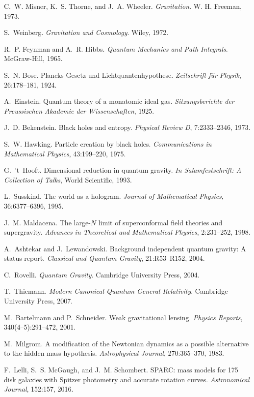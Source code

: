\documentclass[11pt]{article}
\begin{document}
\begin{thebibliography}{99}
C.~W. Misner, K.~S. Thorne, and J.~A. Wheeler.
\emph{Gravitation}.
W. H. Freeman, 1973.

S.~Weinberg.
\emph{Gravitation and Cosmology}.
Wiley, 1972.

R.~P. Feynman and A.~R. Hibbs.
\emph{Quantum Mechanics and Path Integrals}.
McGraw-Hill, 1965.

S.~N. Bose.
Plancks Gesetz und Lichtquantenhypothese.
\emph{Zeitschrift für Physik}, 26:178--181, 1924.

A.~Einstein.
Quantum theory of a monatomic ideal gas.
\emph{Sitzungsberichte der Preussischen Akademie der Wissenschaften}, 1925.

J.~D. Bekenstein.
Black holes and entropy.
\emph{Physical Review D}, 7:2333--2346, 1973.

S.~W. Hawking.
Particle creation by black holes.
\emph{Communications in Mathematical Physics}, 43:199--220, 1975.

G.~'t~Hooft.
Dimensional reduction in quantum gravity.
\emph{In Salamfestschrift: A Collection of Talks}, World Scientific, 1993.

L.~Susskind.
The world as a hologram.
\emph{Journal of Mathematical Physics}, 36:6377--6396, 1995.

J.~M. Maldacena.
The large-$N$ limit of superconformal field theories and supergravity.
\emph{Advances in Theoretical and Mathematical Physics}, 2:231--252, 1998.

A.~Ashtekar and J.~Lewandowski.
Background independent quantum gravity: A status report.
\emph{Classical and Quantum Gravity}, 21:R53--R152, 2004.

C.~Rovelli.
\emph{Quantum Gravity}.
Cambridge University Press, 2004.

T.~Thiemann.
\emph{Modern Canonical Quantum General Relativity}.
Cambridge University Press, 2007.

M.~Bartelmann and P.~Schneider.
Weak gravitational lensing.
\emph{Physics Reports}, 340(4--5):291--472, 2001.

M.~Milgrom.
A modification of the Newtonian dynamics as a possible alternative to the hidden mass hypothesis.
\emph{Astrophysical Journal}, 270:365--370, 1983.

F.~Lelli, S.~S. McGaugh, and J.~M. Schombert.
SPARC: mass models for 175 disk galaxies with Spitzer photometry and accurate rotation curves.
\emph{Astronomical Journal}, 152:157, 2016.

\end{thebibliography}
\end{document}
